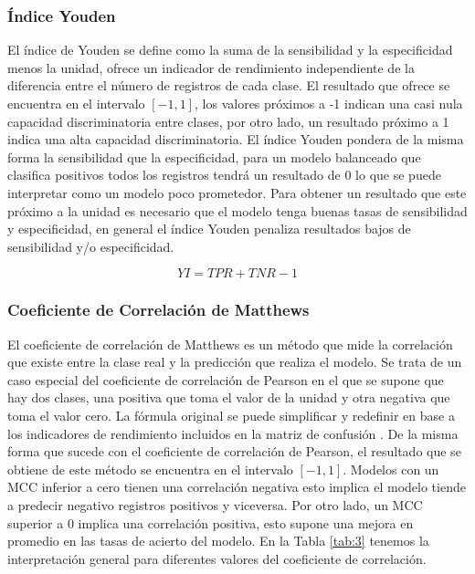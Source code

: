 \subsubsection{Índice Youden}

El índice de Youden \cite{Youden1950} se define como la suma de la sensibilidad y la especificidad menos la unidad, ofrece un indicador de rendimiento independiente de la diferencia entre el número de registros de cada clase. El resultado que ofrece se encuentra en el intervalo $[-1, 1]$, los valores próximos a -1 indican una casi nula capacidad discriminatoria entre clases, por otro lado, un resultado próximo a 1 indica una alta capacidad discriminatoria. El índice Youden pondera de la misma forma la sensibilidad que la especificidad, para un modelo balanceado que clasifica positivos todos los registros tendrá un resultado de 0 lo que se puede interpretar como un modelo poco prometedor. Para obtener un resultado que este próximo a la unidad es necesario que el modelo tenga buenas tasas de sensibilidad y especificidad, en general el índice Youden penaliza resultados bajos de sensibilidad y/o especificidad.
\bigbreak

\begin{equation}
    YI = TPR + TNR - 1
    \label{eq:YI}
\end{equation}

\bigbreak




\subsubsection{Coeficiente de Correlación de Matthews}

El coeficiente de correlación de Matthews \cite{Matthews1975} es un método que mide la correlación que existe entre la clase real y la predicción que realiza el modelo. Se trata de un caso especial del coeficiente de correlación de Pearson en el que se supone que hay dos clases, una positiva que toma el valor de la unidad y otra negativa que toma el valor cero. La fórmula original se puede simplificar y redefinir en base a los indicadores de rendimiento incluidos en la matriz de confusión \cite{LeiMao2019}. De la misma forma que sucede con el coeficiente de correlación de Pearson, el resultado que se obtiene de este método se encuentra en el intervalo $[-1, 1]$. Modelos con un MCC inferior a cero tienen una correlación negativa esto implica el modelo tiende a predecir negativo registros positivos y viceversa. Por otro lado, un MCC superior a 0 implica una correlación positiva, esto supone una mejora en promedio en las tasas de acierto del modelo. En la Tabla \ref{tab:3} tenemos la interpretación general para diferentes valores del coeficiente de correlación.

